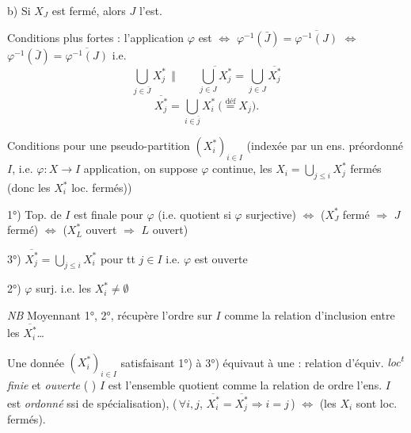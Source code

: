 \documentclass[11pt,a4paper]{article}
\begin{document}
b) Si $X_J$ est fermé, alors $J$ l'est.


Conditions plus fortes :   l'application  $\varphi$ est  \struck{\ill{}} $\Longleftrightarrow$ $\varphi^{-1}(\bar J)=\overline{\varphi^{-1}(J)}$ $\Longleftrightarrow$ $\varphi^{-1}(\bar J)=\overline{\varphi^{-1}(J)}$ i.e.
\[
\bigcup_{j\in\bar J}X_j^{*}\ \ \Big\Vert \qquad \overline{\bigcup_{j\in J}X_j^{*}}=\bigcup_{j\in J}\overline{X_j^{*}}
\]
\[
\overline{X_j^{*}}=\bigcup_{i\in\bar j}X_i^{*}\ \Big(\overset{\text{déf}}{=}X_j\Big).
\]

Conditions pour une pseudo-partition $(X_i^{*})_{i\in I}$  (indexée par un ens. préordonné $I$, i.e. $\varphi:X\to I$ application, on suppose $\varphi$ continue,  les $X_i=\bigcup_{j\le i}X_j^{*}$ fermés (donc les $X_i^{*}$ loc. fermés))

1°) Top. de $I$ est finale pour $\varphi$ (i.e. quotient si $\varphi$ surjective) $\Longleftrightarrow$ ($X_J^{*}$ fermé $\Rightarrow$ $J$ fermé) $\Longleftrightarrow$ ($X_L^{*}$ ouvert $\Rightarrow$ $L$ ouvert)

 3°) $\overline{X_j^{*}}=\bigcup_{j\le i}X_i^{*}$ pour tt $j\in I$ i.e. $\varphi$ est ouverte

2°) $\varphi$ surj. i.e. les $X_i^{*}\neq\emptyset$

\emph{NB} Moyennant 1°, 2°,  récupère l'ordre sur $I$ comme la relation d'inclusion entre les $\overline{X_i^{*}}$\ldots

Une donnée $(X_i^{*})_{i\in I}$ satisfaisant 1°) à 3°) équivaut à une \struck{\ill{}} :  relation d'équiv. \emph{loc\textsuperscript{t} finie} et \emph{ouverte}  (\ill{} \ill{})  $I$ est l'ensemble quotient \ill{} comme la relation de ordre \emph{} l'ens. $I$ est \emph{ordonné} \struck{\ill{}} ssi de spécialisation), (\,$\forall i,j$, $\overline{X_i^{*}}=\overline{X_j^{*}}\Rightarrow i=j$\,) $\Longleftrightarrow$ (les $X_i$ sont loc. fermés).
\end{document}
